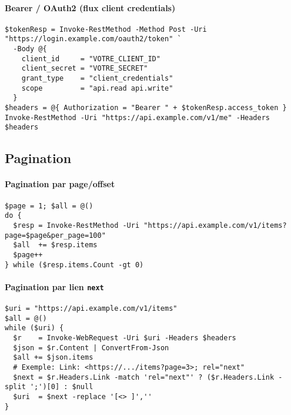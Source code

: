 \documentclass[a4paper,12pt]{article}
\begin{document}
\paragraph{Bearer / OAuth2 (flux client credentials)}
\begin{verbatim}
$tokenResp = Invoke-RestMethod -Method Post -Uri "https://login.example.com/oauth2/token" `
  -Body @{
    client_id     = "VOTRE_CLIENT_ID"
    client_secret = "VOTRE_SECRET"
    grant_type    = "client_credentials"
    scope         = "api.read api.write"
  }
$headers = @{ Authorization = "Bearer " + $tokenResp.access_token }
Invoke-RestMethod -Uri "https://api.example.com/v1/me" -Headers $headers
\end{verbatim}

\subsection{Pagination}
\paragraph{Pagination par page/offset}
\begin{verbatim}
$page = 1; $all = @()
do {
  $resp = Invoke-RestMethod -Uri "https://api.example.com/v1/items?page=$page&per_page=100"
  $all  += $resp.items
  $page++
} while ($resp.items.Count -gt 0)
\end{verbatim}

\paragraph{Pagination par lien \texttt{next}}
\begin{verbatim}
$uri = "https://api.example.com/v1/items"
$all = @()
while ($uri) {
  $r    = Invoke-WebRequest -Uri $uri -Headers $headers
  $json = $r.Content | ConvertFrom-Json
  $all += $json.items
  # Exemple: Link: <https://.../items?page=3>; rel="next"
  $next = $r.Headers.Link -match 'rel="next"' ? ($r.Headers.Link -split ';')[0] : $null
  $uri  = $next -replace '[<> ]',''
}
\end{verbatim}
\end{document}
